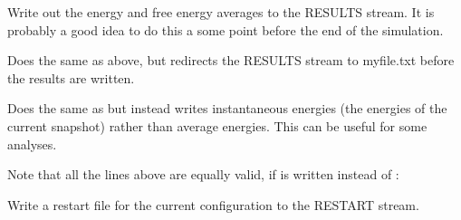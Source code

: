 \documentclass[letterpaper,10pt,english]{sphinxmanual}
\begin{document}
Write out the energy and free energy averages to the RESULTS stream. It is probably a good idea to do this a some point before the end of the simulation.

%
\begin{sphinxVerbatim}[commandchars=\\\{\}]
   
\end{sphinxVerbatim}

Does the same as above, but redirects the RESULTS stream to myfile.txt before the results are written.

%
\begin{sphinxVerbatim}[commandchars=\\\{\}]
   
\end{sphinxVerbatim}

Does the same as  but instead writes instantaneous energies (the energies of the current snapshot) rather than average energies. This can be useful for some analyses.

Note that all the  lines above are equally valid, if  is written instead of :

%
\begin{sphinxVerbatim}[commandchars=\\\{\}]
   
\end{sphinxVerbatim}

\ignorespaces 
\def\sphinxLiteralBlockLabel{\label{\detokenize{protoms:index-74}}}
%
\begin{sphinxVerbatim}[commandchars=\\\{\}]
  
\end{sphinxVerbatim}

Write a restart file for the current configuration to the RESTART stream.

%
\begin{sphinxVerbatim}[commandchars=\\\{\}]
   
\end{sphinxVerbatim}
\end{document}
